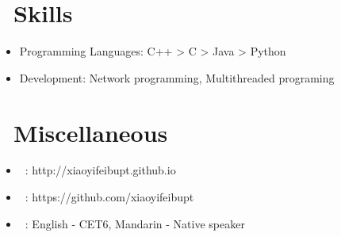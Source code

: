 \documentclass{resume}
\begin{document}
\section{\faCogs\ Skills}
\begin{itemize}[parsep=0.5ex]
  \item Programming Languages: C++ > C > Java > Python
  \item Development: Network programming, Multithreaded programing
\end{itemize}


\section{\faMapsigns\ Miscellaneous}
\begin{itemize}[parsep=0.5ex]
  \item \faHome\ : http://xiaoyifeibupt.github.io
  \item \faGithub\ : https://github.com/xiaoyifeibupt
  \item \faLanguage\ : English - CET6, Mandarin - Native speaker
\end{itemize}
\end{document}
